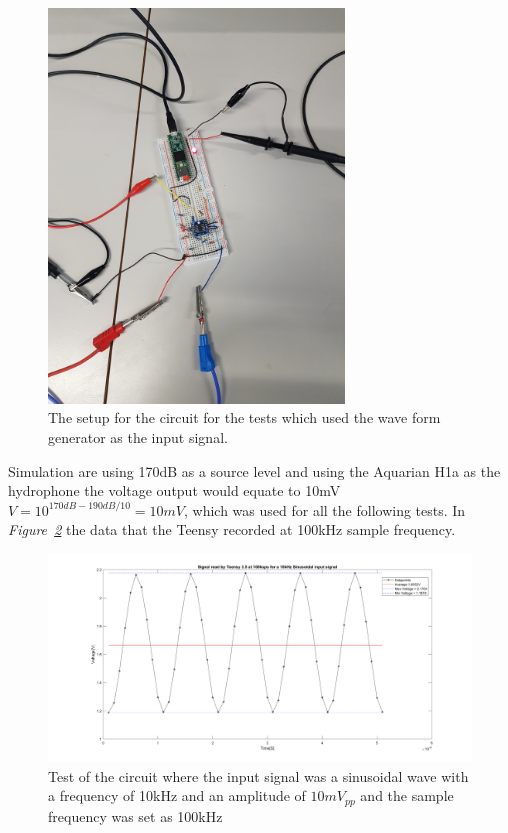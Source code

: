 \begin{figure}[h]
    \centering
    \includegraphics[width=0.7\textwidth]{graphics/TestSetup.jpg}
    \caption{The setup for the circuit for the tests which used the wave form generator as the input signal.}
    \label{fig:testCircSetup}
\end{figure}



\clearpage




Simulation are using 170dB as a source level and using the Aquarian H1a as the hydrophone the voltage output would equate to 10mV $V = 10^{170dB-190dB/10} = 10mV$, which was used for all the following tests.
In \textit{Figure~\ref{fig:Teensy10k100k}} the data that the Teensy recorded at 100kHz sample frequency.

\begin{figure}[h]
    \centering
    \includegraphics[width=1.0\textwidth]{graphics/10kin_100ksampl.png}
    \caption{Test of the circuit where the input signal was a sinusoidal wave with a frequency of 10kHz and an amplitude of $10mV_{pp}$ and the sample frequency was set as 100kHz}
    \label{fig:Teensy10k100k}
\end{figure}

